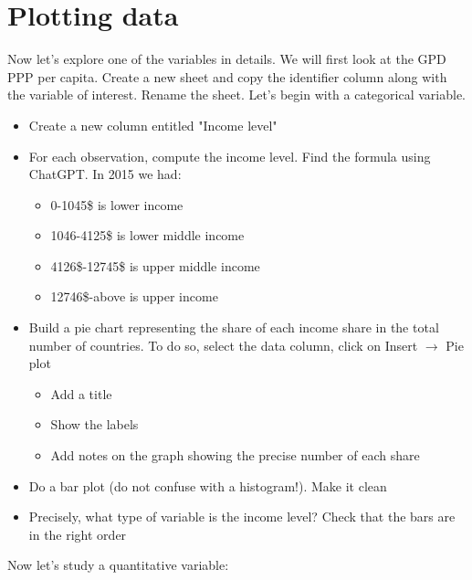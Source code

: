 \documentclass{article}
\begin{document}
    \section*{Plotting data}

    Now let's explore one of the variables in details. We will first look at the GPD PPP per capita. Create a new sheet and copy the identifier column along with the variable of interest. Rename the sheet. Let's begin with a categorical variable.
    \begin{itemize}
        \item Create a new column entitled "Income level"
        \item For each observation, compute the income level. Find the formula using ChatGPT. In 2015 we had:
        \begin{itemize}
            \item 0-1045\$ is lower income
            \item 1046-4125\$ is lower middle income
            \item 4126\$-12745\$ is upper middle income
            \item 12746\$-above is upper income
        \end{itemize}
        \item Build a pie chart representing the share of each income share in the total number of countries. To do so, select the data column, click on Insert $\rightarrow$ Pie plot
        \begin{itemize}
            \item Add a title
            \item Show the labels
            \item Add notes on the graph showing the precise number of each share
        \end{itemize}
        \item Do a bar plot (do not confuse with a histogram!). Make it clean
        \item Precisely, what type of variable is the income level? Check that the bars are in the right order
    \end{itemize}
    Now let's study a quantitative variable:
\end{document}
